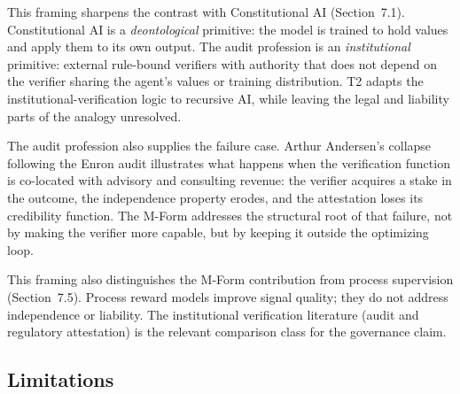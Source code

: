 \documentclass[11pt]{article}
\begin{document}
This framing sharpens the contrast with Constitutional AI (Section~7.1). Constitutional AI is a \emph{deontological} primitive: the model is trained to hold values and apply them to its own output. The audit profession is an \emph{institutional} primitive: external rule-bound verifiers with authority that does not depend on the verifier sharing the agent's values or training distribution. T2 adapts the institutional-verification logic to recursive AI, while leaving the legal and liability parts of the analogy unresolved.

The audit profession also supplies the failure case. Arthur Andersen's collapse following the Enron audit illustrates what happens when the verification function is co-located with advisory and consulting revenue: the verifier acquires a stake in the outcome, the independence property erodes, and the attestation loses its credibility function. The M-Form addresses the structural root of that failure, not by making the verifier more capable, but by keeping it outside the optimizing loop.

This framing also distinguishes the M-Form contribution from process supervision (Section~7.5). Process reward models improve signal quality; they do not address independence or liability. The institutional verification literature (audit and regulatory attestation) is the relevant comparison class for the governance claim.

\subsection{Limitations}
\end{document}
